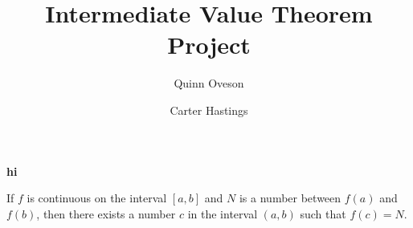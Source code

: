 \documentclass{report}
\title{Intermediate Value Theorem Project}
\author{Quinn Oveson \and Carter Hastings}
\begin{document}
\maketitle


\textbf{hi} 
\begin{theorem}
  If $f$ is continuous on the interval $[a, b]$ and $N$ is a number between $f(a)$ and $f(b)$, then there exists a number $c$ in the interval $(a, b)$ such that $f(c) = N$.

\end{theorem}
\end{document}
